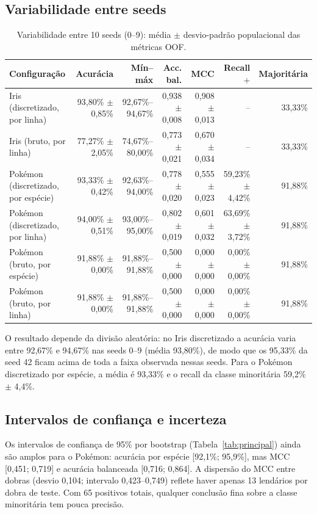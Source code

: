 \documentclass[a4paper,11pt]{article}
\begin{document}
\subsection{Variabilidade entre seeds}
\begin{table}[htbp]
\centering
\small
\caption{Variabilidade entre 10 seeds (0--9): média $\pm$ desvio-padrão populacional das métricas OOF.}
\label{tab:seeds}
\begin{tabular}{lrrrrrr}
\toprule
Configuração & Acurácia & Mín--máx & Acc. bal. & MCC & Recall $+$ & Majoritária \\
\midrule
Iris (discretizado, por linha) & 93,80\% $\pm$ 0,85\% & 92,67\%--94,67\% & 0,938 $\pm$ 0,008 & 0,908 $\pm$ 0,013 & -- & 33,33\% \\
Iris (bruto, por linha) & 77,27\% $\pm$ 2,05\% & 74,67\%--80,00\% & 0,773 $\pm$ 0,021 & 0,670 $\pm$ 0,034 & -- & 33,33\% \\
Pokémon (discretizado, por espécie) & 93,33\% $\pm$ 0,42\% & 92,63\%--94,00\% & 0,778 $\pm$ 0,020 & 0,555 $\pm$ 0,023 & 59,23\% $\pm$ 4,42\% & 91,88\% \\
Pokémon (discretizado, por linha) & 94,00\% $\pm$ 0,51\% & 93,00\%--95,00\% & 0,802 $\pm$ 0,019 & 0,601 $\pm$ 0,032 & 63,69\% $\pm$ 3,72\% & 91,88\% \\
Pokémon (bruto, por espécie) & 91,88\% $\pm$ 0,00\% & 91,88\%--91,88\% & 0,500 $\pm$ 0,000 & 0,000 $\pm$ 0,000 & 0,00\% $\pm$ 0,00\% & 91,88\% \\
Pokémon (bruto, por linha) & 91,88\% $\pm$ 0,00\% & 91,88\%--91,88\% & 0,500 $\pm$ 0,000 & 0,000 $\pm$ 0,000 & 0,00\% $\pm$ 0,00\% & 91,88\% \\
\bottomrule
\end{tabular}
\end{table}

O resultado depende da divis\~ao aleat\'oria: no Iris discretizado a acur\'acia varia entre 92,67\% e 94,67\% nas seeds 0--9 (m\'edia 93,80\%), de modo que os 95,33\% da seed 42 ficam acima de toda a faixa observada nessas seeds. Para o Pok\'emon discretizado por esp\'ecie, a m\'edia \'e 93,33\% e o recall da classe minorit\'aria 59,2\% $\pm$ 4,4\%.

\subsection{Intervalos de confian\c{c}a e incerteza}
Os intervalos de confian\c{c}a de 95\% por bootstrap (Tabela~\ref{tab:principal}) ainda s\~ao amplos para o Pok\'emon: acur\'acia por esp\'ecie [92,1\%; 95,9\%], mas MCC [0,451; 0,719] e acur\'acia balanceada [0,716; 0,864]. A dispers\~ao do MCC entre dobras (desvio 0,104; intervalo 0,423--0,749) reflete haver apenas 13 lend\'arios por dobra de teste. Com 65 positivos totais, qualquer conclus\~ao fina sobre a classe minorit\'aria tem pouca precis\~ao.
\end{document}
